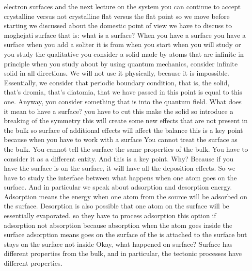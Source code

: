 electron surfaces and the next lecture on the system you can continue to accept crystalline versus not crystalline flat versus the flat point so we move before starting we discussed about the domestic point of view we have to discuss to moghejati surface that is: what is a surface?
When you have a surface you have a surface when you add a soliter it is from when you start when you will study or you study the qualitative you consider a solid made by atoms that are infinite in principle when you study about by using quantum mechanics, consider infinite solid in all directions. We will not use it physically, because it is impossible. Essentially, we consider that periodic boundary condition, that is, the solid, that's dromia, that's diatomia, that we have passed in this point is equal to this one. Anyway, you consider something that is into the quantum field. What does it mean to have a surface? you have to cut this make the solid so introduce a breaking of the symmetry this will create some new effects that are not present in the bulk so surface of additional effects will affect the balance this is a key point because when you have to work with a surface You cannot treat the surface as the bulk. You cannot tell the surface the same properties of the bulk. You have to consider it as a different entity. And this is a key point. Why? Because if you have the surface is on the surface, it will have all the deposition effects. So we have to study the interface between what happens when one atom goes on the surface. And in particular we speak about adsorption and desorption energy. Adsorption means the energy when one atom from the source will be adsorbed on the surface. Desorption is also possible that one atom on the surface will be essentially evaporated. so they have to process adsorption this option if adsorption not absorption because absorption when the atom goes inside the surface adsorption means goes on the surface of the is attached to the surface but stays on the surface not inside Okay, what happened on surface? Surface has different properties from the bulk, and in particular, the tectonic processes have different properties.
